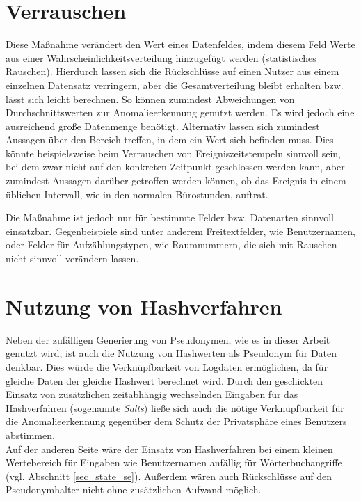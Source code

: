 \section{Verrauschen} %

Diese Maßnahme verändert den Wert eines Datenfeldes, indem diesem Feld Werte aus einer Wahrscheinlichkeitsverteilung hinzugefügt werden (statistisches Rauschen). 
Hierdurch lassen sich die Rückschlüsse auf einen Nutzer aus einem einzelnen Datensatz verringern, aber die Gesamtverteilung bleibt erhalten bzw. lässt sich leicht berechnen. 
So können zumindest Abweichungen von Durchschnittswerten zur Anomalieerkennung genutzt werden. 
Es wird jedoch eine ausreichend große Datenmenge benötigt. Alternativ lassen sich zumindest Aussagen über den Bereich treffen, in dem ein Wert sich befinden muss. Dies könnte beispielsweise beim Verrauschen von Ereigniszeitstempeln sinnvoll sein, bei dem zwar nicht auf den konkreten Zeitpunkt geschlossen werden kann, aber zumindest Aussagen darüber getroffen werden können, ob das Ereignis in einem üblichen Intervall, wie in den normalen Bürostunden, auftrat.

Die Maßnahme ist jedoch nur für bestimmte Felder bzw. Datenarten sinnvoll einsatzbar. Gegenbeispiele sind unter anderem Freitextfelder, wie Benutzernamen, oder Felder für Aufzählungstypen, wie Raumnummern, die sich mit Rauschen nicht sinnvoll verändern lassen. 

\section{Nutzung von Hashverfahren}

Neben der zufälligen Generierung von Pseudonymen, wie es in dieser Arbeit genutzt wird, ist auch die Nutzung von Hashwerten als Pseudonym für Daten denkbar. Dies würde die Verknüpfbarkeit von Logdaten ermöglichen, da für gleiche Daten der gleiche Hashwert berechnet wird. Durch den geschickten Einsatz von zusätzlichen zeitabhängig wechselnden Eingaben für das Hashverfahren (sogenannte \textit{Salts}) ließe sich auch die nötige Verknüpfbarkeit für die Anomalieerkennung gegenüber dem Schutz der Privatsphäre eines Benutzers abstimmen.\\
Auf der anderen Seite wäre der Einsatz von Hashverfahren bei einem kleinen Wertebereich für Eingaben wie Benutzernamen anfällig für Wörterbuchangriffe (vgl. Abschnitt \ref{sec_state_se}). Außerdem wären auch Rückschlüsse auf den Pseudonymhalter nicht ohne zusätzlichen Aufwand möglich.


